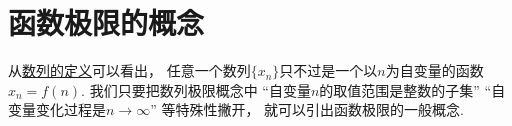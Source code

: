 \section{函数极限的概念}
从\hyperref[definition:数列.数列的定义]{数列的定义}可以看出，
任意一个数列\(\{x_n\}\)只不过是一个以\(n\)为自变量的函数\(x_n = f(n)\).
我们只要把数列极限概念中
“自变量\(n\)的取值范围是整数的子集”
“自变量变化过程是\(n\to\infty\)”
等特殊性撇开，
就可以引出函数极限的一般概念.




